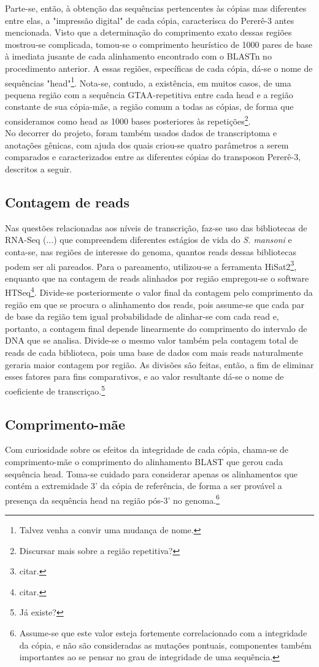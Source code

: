 \documentclass[12pt]{article}
\begin{document}
\begin{multicols}{2}
	Parte-se, então, à obtenção das sequências pertencentes às cópias mas diferentes entre elas, a "impressão digital" de cada cópia, caracterísca do Pererê-3 antes mencionada. Visto que a determinação do comprimento exato dessas regiões mostrou-se complicada, tomou-se o comprimento heurístico de 1000 pares de base à imediata jusante de cada alinhamento encontrado com o BLASTn no procedimento anterior. A essas regiões, específicas de cada cópia, dá-se o nome de sequências "head"\footnote{Talvez venha a convir uma mudança de nome.}. Nota-se, contudo, a existência, em muitos casos, de uma pequena região com a sequência GTAA-repetitiva entre cada head e a região constante de sua cópia-mãe, a região comum a todas as cópias, de forma que consideramos como head as 1000 bases posteriores às repetições\footnote{Discursar mais sobre a região repetitiva?}.\\

No decorrer do projeto, foram também usados dados de transcriptoma e anotações gênicas, com ajuda dos quais criou-se quatro parâmetros a serem comparados e caracterizados entre as diferentes cópias do transposon Pererê-3, descritos a seguir.

\subsection{Contagem de reads}
	Nas questões relacionadas aos níveis de transcrição, faz-se uso das bibliotecas de RNA-Seq (...) que compreendem diferentes estágios de vida do \textit{S. mansoni} e conta-se, nas regiões de interesse do genoma, quantos reads dessas bibliotecas podem ser ali pareados. Para o pareamento, utilizou-se a ferramenta HiSat2\footnote{citar.}, enquanto que na contagem de reads alinhados por região empregou-se o software HTSeq\footnote{citar.}. Divide-se posteriormente o valor final da contagem pelo comprimento da região em que se procura o alinhamento dos reads, pois assume-se que cada par de base da região tem igual probabilidade de alinhar-se com cada read e, portanto, a contagem final depende linearmente do comprimento do intervalo de DNA que se analisa. Divide-se o mesmo valor também pela contagem total de reads de cada biblioteca, pois uma base de dados com mais reads naturalmente geraria maior contagem por região. As divisões são feitas, então, a fim de eliminar esses fatores para fins comparativos, e ao valor resultante dá-se o nome de coeficiente de transcriçao.\footnote{Já existe?}

\subsection{Comprimento-mãe}
	Com curiosidade sobre os efeitos da integridade de cada cópia, chama-se de comprimento-mãe o comprimento do alinhamento BLAST que gerou cada sequência head. Toma-se cuidado para considerar apenas os alinhamentos que contém a extremidade 3' da cópia de referência, de forma a ser provável a presença da sequência head na região pós-3' no genoma.\footnote{Assume-se que este valor esteja fortemente correlacionado com a integridade da cópia, e não são consideradas as mutações pontuais, componentes também importantes ao se pensar no grau de integridade de uma sequência.}


\end{multicols}
\end{document}
